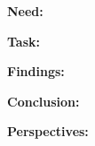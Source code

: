 


\noindent\textbf{Need:} 

\noindent\textbf{Task:} 

\noindent\textbf{Findings:} 


\noindent\textbf{Conclusion:}

\noindent\textbf{Perspectives:}
